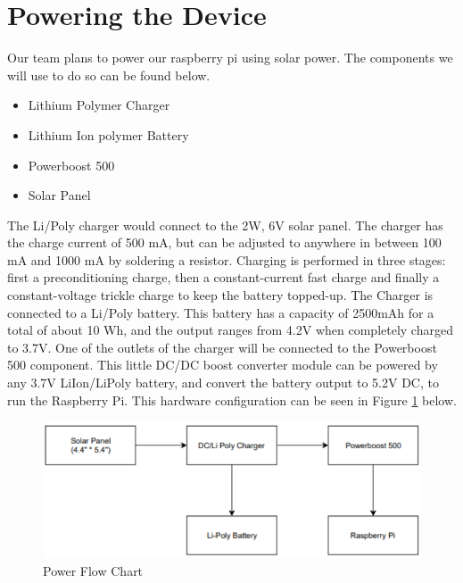\section{Powering the Device}
Our team plans to power our raspberry pi using solar power. The components we will use to do so can be found below. 
\begin{itemize}
    \item Lithium Polymer Charger
    \item Lithium Ion polymer Battery
    \item Powerboost 500
    \item Solar Panel
\end{itemize}

The Li/Poly charger would connect to the 2W, 6V solar panel. The charger has the charge current of 500 mA, but can be adjusted to anywhere in between 100 mA and 1000 mA by soldering a resistor. Charging is performed in three stages: first a preconditioning charge, then a constant-current fast charge and finally a constant-voltage trickle charge to keep the battery topped-up. The Charger is connected to a Li/Poly battery. This battery has a capacity of 2500mAh for a total of about 10 Wh, and the output ranges from 4.2V when completely charged to 3.7V. One of the outlets of the charger will be connected to the Powerboost 500 component. This little DC/DC boost converter module can be powered by any 3.7V LiIon/LiPoly battery, and convert the battery output to 5.2V DC, to run the Raspberry Pi. This hardware configuration can be seen in Figure \ref{flow} below. \hfill

\begin{figure}[H]
\centering
\includegraphics[scale=0.8]{graphics/power_flow.PNG}
\caption{Power Flow Chart}
\label{flow}

\end{figure}